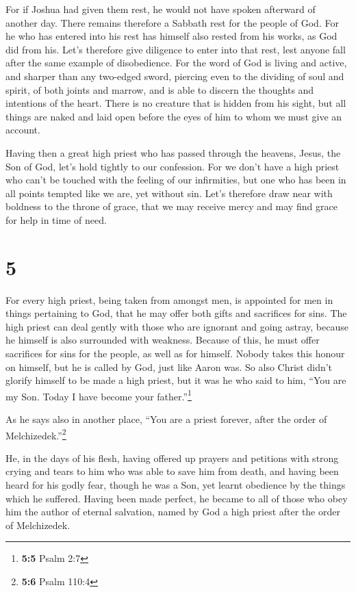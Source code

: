  For if Joshua had given them rest, he would not have
spoken afterward of another day.  There remains therefore
a Sabbath rest for the people of God.  For he who has
entered into his rest has himself also rested from his works, as God did
from his.  Let's therefore give diligence to enter into
that rest, lest anyone fall after the same example of disobedience.
 For the word of God is living and active, and sharper
than any two-edged sword, piercing even to the dividing of soul and
spirit, of both joints and marrow, and is able to discern the thoughts
and intentions of the heart.  There is no creature that
is hidden from his sight, but all things are naked and laid open before
the eyes of him to whom we must give an account.

 Having then a great high priest who has passed through
the heavens, Jesus, the Son of God, let's hold tightly to our
confession.  For we don't have a high priest who can't be
touched with the feeling of our infirmities, but one who has been in all
points tempted like we are, yet without sin.  Let's
therefore draw near with boldness to the throne of grace, that we may
receive mercy and may find grace for help in time of need.

\hypertarget{section-4}{%
\section{5}\label{section-4}}

 For every high priest, being taken from amongst men, is
appointed for men in things pertaining to God, that he may offer both
gifts and sacrifices for sins.  The high priest can deal
gently with those who are ignorant and going astray, because he himself
is also surrounded with weakness.  Because of this, he
must offer sacrifices for sins for the people, as well as for himself.
 Nobody takes this honour on himself, but he is called by
God, just like Aaron was.  So also Christ didn't glorify
himself to be made a high priest, but it was he who said to him, ``You
are my Son. Today I have become your father.''\footnote{\textbf{5:5}
  Psalm 2:7}

 As he says also in another place, ``You are a priest
forever, after the order of Melchizedek.''\footnote{\textbf{5:6} Psalm
  110:4}

 He, in the days of his flesh, having offered up prayers
and petitions with strong crying and tears to him who was able to save
him from death, and having been heard for his godly fear, 
though he was a Son, yet learnt obedience by the things which he
suffered.  Having been made perfect, he became to all of
those who obey him the author of eternal salvation, 
named by God a high priest after the order of Melchizedek.

